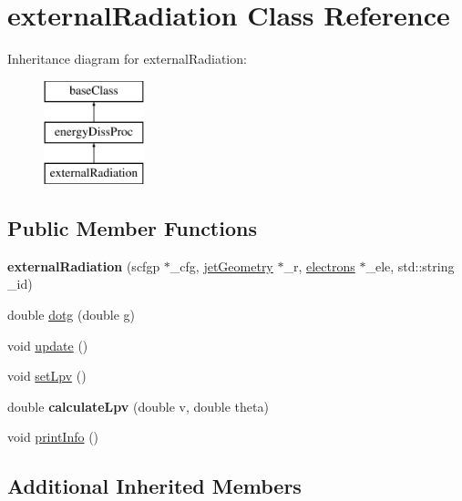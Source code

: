 \hypertarget{classexternalRadiation}{\section{external\-Radiation Class Reference}
\label{classexternalRadiation}
}
Inheritance diagram for external\-Radiation\-:\begin{figure}[H]
\begin{center}
\leavevmode
\includegraphics[height=3.000000cm]{classexternalRadiation}
\end{center}
\end{figure}
\subsection*{Public Member Functions}
\begin{DoxyCompactItemize}
\item 
\hypertarget{classexternalRadiation_af5a905e2a45845747dfcb1035ed69069}{{\bfseries external\-Radiation} (scfgp $\ast$\-\_\-cfg, \hyperlink{classjetGeometry}{jet\-Geometry} $\ast$\-\_\-r, \hyperlink{classelectrons}{electrons} $\ast$\-\_\-ele, std\-::string \-\_\-id)}\label{classexternalRadiation_af5a905e2a45845747dfcb1035ed69069}

\item 
double \hyperlink{classexternalRadiation_af3011c765884717fac63035c51c4b0a2}{dotg} (double g)
\item 
void \hyperlink{classexternalRadiation_aa458ea6aefe596525520b06fd6065ffd}{update} ()
\item 
void \hyperlink{classexternalRadiation_a57048bff39c56bb1d9ec1e9c88d39323}{set\-Lpv} ()
\item 
\hypertarget{classexternalRadiation_a7ee57d513164aff07202d27b743406c9}{double {\bfseries calculate\-Lpv} (double v, double theta)}\label{classexternalRadiation_a7ee57d513164aff07202d27b743406c9}

\item 
void \hyperlink{classexternalRadiation_a8747348f3468165fca0c5547e207b5a9}{print\-Info} ()
\end{DoxyCompactItemize}
\subsection*{Additional Inherited Members}


